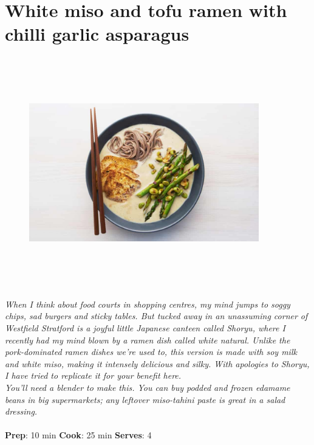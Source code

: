 \documentclass{book}
\begin{document}
\section{White miso and tofu ramen with chilli garlic asparagus}
\begin{figure}
\centering\includegraphics[width=10cm,height=10cm,keepaspectratio]{Recipe_Pictures/White_miso_and_tofu_ramen_with_chilli_garlic_asparagus.png}
\end{figure}
\emph{When I think about food courts in shopping centres, my mind jumps to soggy chips, sad burgers and sticky tables. But tucked away in an unassuming corner of Westfield Stratford is a joyful little Japanese canteen called Shoryu, where I recently had my mind blown by a ramen dish called white natural. Unlike the pork-dominated ramen dishes we’re used to, this version is made with soy milk and white miso, making it intensely delicious and silky. With apologies to Shoryu, I have tried to replicate it for your benefit here.\\ 
You’ll need a blender to make this. You can buy podded and frozen edamame beans in big supermarkets; any leftover miso-tahini paste is great in a salad dressing.}\\\\ 
\textbf{Prep}: 10 min
\textbf{Cook}: 25 min
\textbf{Serves}: 4
\end{document}
